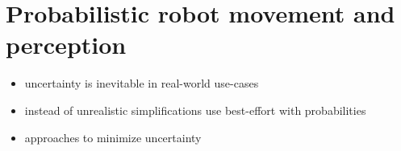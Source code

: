 \section{Probabilistic robot movement and perception}
\begin{itemize}
	\item{uncertainty is inevitable in real-world use-cases}
	\item{instead of unrealistic simplifications use best-effort with probabilities}
	\item{approaches to minimize uncertainty}
\end{itemize}